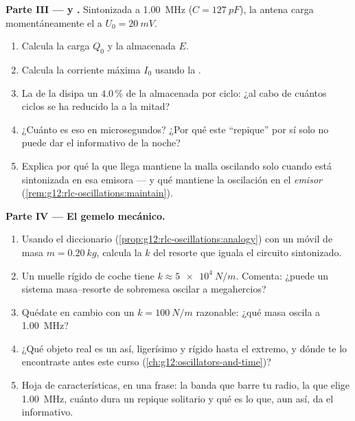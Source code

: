 \begin{problem}
\medskip
\noindent\textbf{Parte III ---  y .}
Sintonizada a \qty{1.00}{MHz} ($C = \qty{127}{pF}$), la antena carga momentáneamente
el  a $U_0 = \qty{20}{mV}$.
\begin{enumerate}[resume]
  \item Calcula la carga $Q_0$ y la  almacenada $E$.
  \item Calcula la corriente máxima $I_0$ usando la .
  \item La  de la  disipa un $4.0\,\%$ de la  almacenada por
        ciclo: ¿al cabo de cuántos ciclos se ha reducido la  a la mitad?
  \item ¿Cuánto es eso en microsegundos? ¿Por qué este ``repique'' por sí solo no
        puede dar el informativo de la noche?
  \item Explica por qué la  que llega mantiene la malla oscilando solo cuando está
        sintonizada en esa emisora --- y qué mantiene la oscilación en el
        \emph{emisor} (\cref{rem:g12:rlc-oscillations:maintain}).
\end{enumerate}

\medskip
\noindent\textbf{Parte IV --- El gemelo mecánico.}
\begin{enumerate}[resume]
  \item Usando el diccionario (\cref{prop:g12:rlc-oscillations:analogy}) con un móvil
        de masa $m = \qty{0.20}{kg}$, calcula la  $k$ del resorte
        que iguala el circuito sintonizado.
  \item Un muelle rígido de coche tiene $k \approx \qty{5e4}{N/m}$. Comenta: ¿puede un
        sistema masa--resorte de sobremesa oscilar a megahercios?
  \item Quédate en cambio con un $k = \qty{100}{N/m}$ razonable: ¿qué masa oscila a
        \qty{1.00}{MHz}?
  \item ¿Qué objeto real es un  así, ligerísimo y rígido hasta el
        extremo, y dónde te lo encontraste antes este curso
        (\cref{ch:g12:oscillators-and-time})?
  \item Hoja de características, en una frase: la banda que barre tu radio, la
         que elige \qty{1.00}{MHz}, cuánto dura un repique solitario y qué es
        lo que, aun así, da el informativo.
\end{enumerate}
\end{problem}
